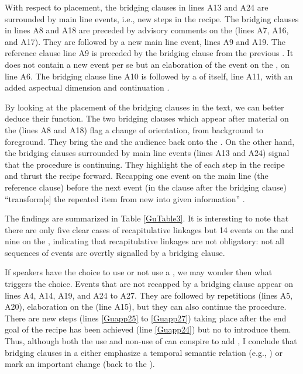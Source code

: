 \documentclass[output=paper]{LSP/langsci}
\begin{document}
With respect to placement, the bridging clauses in lines A13 and A24 are surrounded by main line events, i.e., new steps in the recipe. The bridging clauses in lines A8 and A18 are preceded by advisory comments on the  (lines A7, A16, and A17). They are followed by a new main line event, lines A9 and A19. The reference clause line A9 is preceded by the bridging clause from the previous . It does not contain a new event per se but an elaboration of the event on the , on line A6. The bridging clause line A10 is followed by a  of itself, line A11, with an added aspectual dimension and continuation . 

By looking at the placement of the bridging clauses in the text, we can better deduce their function. The two bridging clauses which appear after material on the  (lines A8 and A18) flag a change of orientation, from background to foreground. They bring the  and the audience back onto the . On the other hand, the bridging clauses surrounded by main line events (lines A13 and A24) signal that the procedure is continuing. They highlight the  of each step in the recipe and thrust the recipe forward. Recapping one event on the main line (the reference clause) before the next event (in the clause after the bridging clause) ``transform[s] the repeated item from new into given information'' \citep[][224]{brown.2000}.   

The findings are summarized in Table \ref{GuTable3}. It is interesting to note that there are only five clear cases of recapitulative linkages but 14 events on the  and nine on the , indicating that recapitulative linkages are not obligatory: not all sequences of events are overtly signalled by a bridging clause. 

If speakers have the choice to use or not use a , we may wonder then what triggers the choice. Events that are not recapped by a bridging clause appear on lines A4, A14, A19, and A24 to A27.  They are followed by repetitions (lines A5, A20), elaboration on the  (line A15), but they can also continue the procedure. There are new steps (lines \ref{Guapp25} to \ref{Guapp27}) taking place after the end goal of the recipe has been achieved  (line \ref{Guapp24}) but no  to introduce them. Thus, although both the use and non-use of  can conspire to add , I conclude that bridging clauses in a  either emphasize a temporal semantic relation (e.g., ) or mark an important  change (back to the ). 
\end{document}
